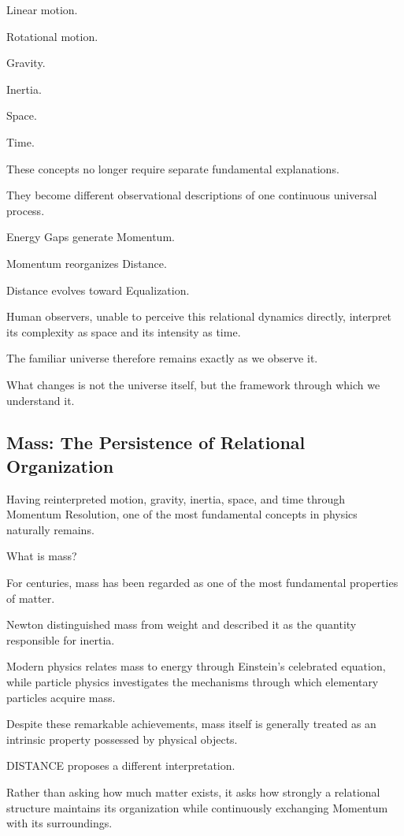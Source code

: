 Linear motion.

Rotational motion.

Gravity.

Inertia.

Space.

Time.

These concepts no longer require separate fundamental explanations.

They become different observational descriptions of one continuous universal process.

Energy Gaps generate Momentum.

Momentum reorganizes Distance.

Distance evolves toward Equalization.

Human observers, unable to perceive this relational dynamics directly, interpret its complexity as space and its intensity as time.

The familiar universe therefore remains exactly as we observe it.

What changes is not the universe itself, but the framework through which we understand it.

\subsection*{\textbf{Mass: The Persistence of Relational Organization}}

Having reinterpreted motion, gravity, inertia, space, and time through Momentum Resolution, one of the most fundamental concepts in physics naturally remains.

What is mass?

For centuries, mass has been regarded as one of the most fundamental properties of matter.

Newton distinguished mass from weight and described it as the quantity responsible for inertia.

Modern physics relates mass to energy through Einstein’s celebrated equation, while particle physics investigates the mechanisms through which elementary particles acquire mass.

Despite these remarkable achievements, mass itself is generally treated as an intrinsic property possessed by physical objects.

DISTANCE proposes a different interpretation.

Rather than asking how much matter exists, it asks how strongly a relational structure maintains its organization while continuously exchanging Momentum with its surroundings.

